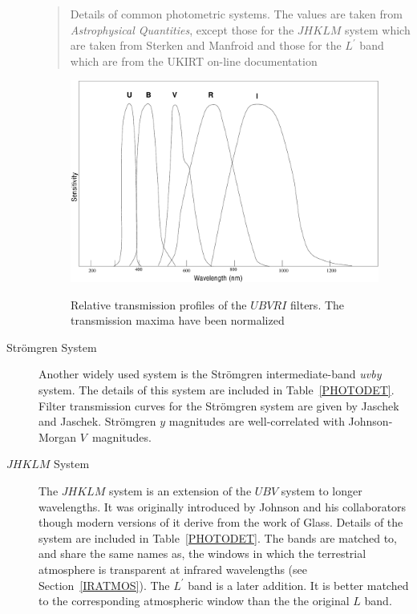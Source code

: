 \documentclass[twoside,11pt]{article}
\newcommand{\htmladdnormallink}[2]{#1}
\begin{document}
\begin{description}
\begin{table}[htbp]
  \begin{quote}
  \caption[Details of common photometric systems.]{Details
   of common photometric systems.  The values are taken from {\it
   Astrophysical Quantities}\/\cite{AQ3}, except those for the $JHKLM$
   system which are taken from Sterken and Manfroid\cite{STERKEN92} and
   those for the $L^{\prime}$ band which are from the
  \htmladdnormallink{UKIRT on-line documentation}
   {http://www.jach.hawaii.edu/UKIRT/home.html}
  \label{PHOTODET} }
  \end{quote}

  \end{table}

  \begin{figure}[htbp]
     \centering
     \includegraphics[totalheight=4.5in,angle=270]{sc6_ubv}
     \begin{quote}
     \caption{Relative transmission profiles of the $UBVRI$ filters.
      The transmission maxima have been normalized
     \label{UBV} }
     \end{quote}
  \end{figure}

  \item[Str\"{o}mgren System] Another widely used system is the Str\"{o}mgren
   intermediate-band {\it uvby}\, system\cite{STROMGREM63, STROMGREM66}.  The
   details of this system are included in Table~\ref{PHOTODET}.  Filter
   transmission curves for the Str\"{o}mgren system are given by Jaschek and
   Jaschek\cite{JASCHEK87}.  Str\"{o}mgren $y$ magnitudes are well-correlated
   with Johnson-Morgan $V$\, magnitudes.

  \item[$JHKLM$ System] The $JHKLM$ system is an extension of the
   $UBV$ system to longer wavelengths.  It was originally introduced by
   Johnson and his collaborators though modern versions of it derive
   from the work of Glass\cite{GLASS74}.  Details of the system are
   included in Table~\ref{PHOTODET}.  The bands are matched to, and share
   the same names as, the windows in which the terrestrial atmosphere is
   transparent at infrared wavelengths (see Section~\ref{IRATMOS}).  The
   $L^{\prime}$ band is a later addition.  It is better matched to the
   corresponding atmospheric window than the the original $L$ band.


\end{description}
\end{document}
